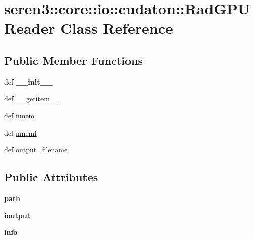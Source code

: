 \hypertarget{classseren3_1_1core_1_1io_1_1cudaton_1_1RadGPUReader}{
\section{seren3::core::io::cudaton::RadGPUReader Class Reference}
\label{classseren3_1_1core_1_1io_1_1cudaton_1_1RadGPUReader}
}
\subsection*{Public Member Functions}
\begin{DoxyCompactItemize}
\item 
\hypertarget{classseren3_1_1core_1_1io_1_1cudaton_1_1RadGPUReader_a03681867b86b41a64e10f93696d709df}{
def {\bfseries \_\-\_\-init\_\-\_\-}}
\label{classseren3_1_1core_1_1io_1_1cudaton_1_1RadGPUReader_a03681867b86b41a64e10f93696d709df}

\item 
def \hyperlink{classseren3_1_1core_1_1io_1_1cudaton_1_1RadGPUReader_a721595765b4d42b82c26068ff8576738}{\_\-\_\-getitem\_\-\_\-}
\item 
def \hyperlink{classseren3_1_1core_1_1io_1_1cudaton_1_1RadGPUReader_a2f3cdcc87e09bb34f8fc6d1655229ab6}{nmem}
\item 
def \hyperlink{classseren3_1_1core_1_1io_1_1cudaton_1_1RadGPUReader_a6578f04222601eeb3b8367c97ee730fe}{nmemf}
\item 
def \hyperlink{classseren3_1_1core_1_1io_1_1cudaton_1_1RadGPUReader_abf574508a4fddfee08cd8c598c5673ae}{output\_\-filename}
\end{DoxyCompactItemize}
\subsection*{Public Attributes}
\begin{DoxyCompactItemize}
\item 
\hypertarget{classseren3_1_1core_1_1io_1_1cudaton_1_1RadGPUReader_aa8234099c3715e615625c2c3c6e31549}{
{\bfseries path}}
\label{classseren3_1_1core_1_1io_1_1cudaton_1_1RadGPUReader_aa8234099c3715e615625c2c3c6e31549}

\item 
\hypertarget{classseren3_1_1core_1_1io_1_1cudaton_1_1RadGPUReader_a1df4edfd9d708d68d53b27421759403e}{
{\bfseries ioutput}}
\label{classseren3_1_1core_1_1io_1_1cudaton_1_1RadGPUReader_a1df4edfd9d708d68d53b27421759403e}

\item 
\hypertarget{classseren3_1_1core_1_1io_1_1cudaton_1_1RadGPUReader_a04295a115e96e827a75941678df7d334}{
{\bfseries info}}
\label{classseren3_1_1core_1_1io_1_1cudaton_1_1RadGPUReader_a04295a115e96e827a75941678df7d334}

\end{DoxyCompactItemize}


